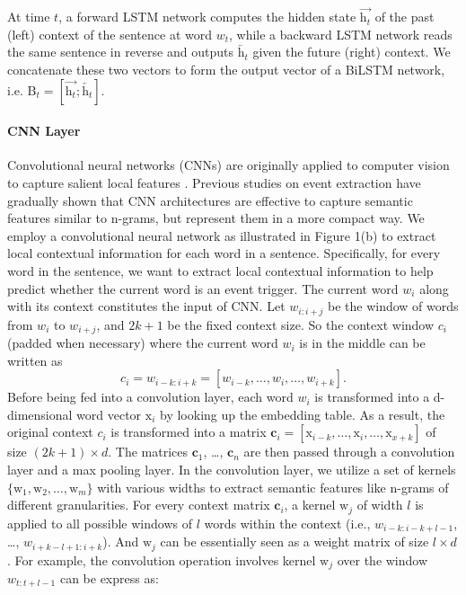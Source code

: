 At time $t$, a forward LSTM network computes the hidden state $\overrightarrow{\text{h}_t}$ of the past (left) context of the sentence at word $w_t$, while a backward LSTM network reads the same sentence in reverse and outputs $\overleftarrow{\text{h}_t}$ given the future (right) context. We concatenate these two vectors to form the output vector of a BiLSTM network, i.e. $\text{B}_t = [\overrightarrow{\text{h}_t}; \overleftarrow{\text{h}_t}]$.

\paragraph{CNN Layer}
Convolutional neural networks (CNNs) are originally applied to computer vision to capture salient local features \cite{lecun1998gradient}. Previous studies on event extraction \cite{nguyen2015event,chen2015event,feng2016language} have gradually shown that CNN architectures are effective to capture semantic features similar to n-grams, but represent them in a more compact way. We employ a convolutional neural network as illustrated in Figure 1(b) to extract local contextual information for each word in a sentence.
Specifically, for every word in the sentence, we want to extract local contextual information to help predict whether the current word is an event trigger. The current word $w_i$ along with its context constitutes the input of CNN. Let $w_{i:i+j}$ be the window of words from $w_i$ to $w_{i+j}$, and $2k+1$ be the fixed context size. So the context window $c_i$ (padded when necessary) where the current word $w_i$ is in the middle can be written as
\begin{equation}
	c_i = w_{i-k:i+k} = [w_{i-k}, \ldots, w_{i}, \ldots, w_{i+k}].
\end{equation}
Before being fed into a convolution layer, each word $w_i$ is transformed into a d-dimensional word vector $\text{x}_i$ by looking up the embedding table. As a result, the original context $c_i$ is transformed into a matrix $\bm{c}_i = [\text{x}_{i-k}, \ldots, \text{x}_i, \ldots, \text{x}_{x+k}]$ of size $(2k+1) \times d$. The matrices $\bm{c}_1$, \ldots, $\bm{c}_n$ are then passed through a convolution layer and a max pooling layer.
In the convolution layer, we utilize a set of kernels $\{\text{w}_1, \text{w}_2, \ldots, \text{w}_m\}$ with various widths to extract semantic features like n-grams of different granularities. For every context matrix $\bm{c}_i$, a kernel $\text{w}_j$ of width $l$ is applied to all possible windows of $l$ words within the context (i.e., $w_{i-k:i-k+l-1}$, \ldots, $w_{i+k-l+1:i+k}$). And $\text{w}_j$ can be essentially seen as a weight matrix of size $l \times d$. For example, the convolution operation involves kernel $\text{w}_j$ over the window $w_{t:t+l-1}$ can be express as:
